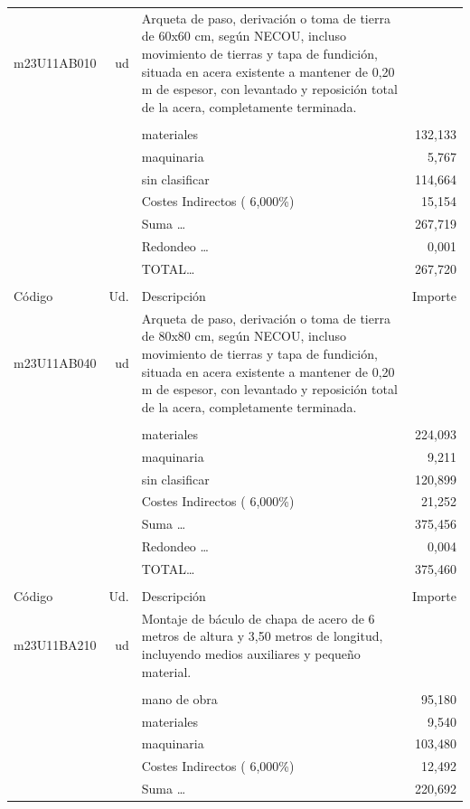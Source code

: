\begin{supertabular}{l r p{60mm} r}
\hline%
m23U11AB010&ud&Arqueta de paso, derivación o toma de tierra de 60x60 cm, según NECOU, incluso movimiento de tierras y tapa de fundición, situada en acera existente a mantener de 0,20 m de espesor, con levantado y reposición total de la acera, completamente terminada.&\\%
&&&\\%
&&materiales&   132,133\\%
&&maquinaria&     5,767\\%
&&sin clasificar&   114,664\\%
&&Costes Indirectos (     6,000\%)&    15,154\\%
&&Suma \ldots&   267,719\\%
&&Redondeo \ldots&     0,001\\%
%
&&TOTAL\ldots&   267,720\\%
&&&\\%
Código&Ud.&Descripción&Importe\\%
\hline%
m23U11AB040&ud&Arqueta de paso, derivación o toma de tierra de 80x80 cm, según NECOU, incluso movimiento de tierras y tapa de fundición, situada en acera existente a mantener de 0,20 m de espesor, con levantado y reposición total de la acera, completamente terminada.&\\%
&&&\\%
&&materiales&   224,093\\%
&&maquinaria&     9,211\\%
&&sin clasificar&   120,899\\%
&&Costes Indirectos (     6,000\%)&    21,252\\%
&&Suma \ldots&   375,456\\%
&&Redondeo \ldots&     0,004\\%
%
&&TOTAL\ldots&   375,460\\%
&&&\\%
Código&Ud.&Descripción&Importe\\%
\hline%
m23U11BA210&ud&Montaje de báculo de chapa de acero de 6 metros de altura y 3,50 metros de longitud, incluyendo medios auxiliares y pequeño material.&\\%
&&&\\%
&&mano de obra&    95,180\\%
&&materiales&     9,540\\%
&&maquinaria&   103,480\\%
&&Costes Indirectos (     6,000\%)&    12,492\\%
&&Suma \ldots&   220,692\\%

\end{supertabular}
